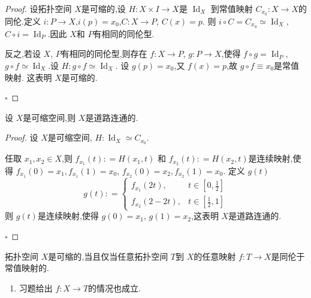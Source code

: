 \documentclass[../../几何与拓扑.tex]{subfiles}
\begin{document}
\begin{proof}

    设拓扑空间 \(  X  \)是可缩的,设 \(  H:X \times I\to X\)是 \(  \operatorname{Id}_{X}  \)   到常值映射 \(  C_{x_0}:X \to X  \)的同伦.定义 \(  i: P \to X  \),\(  i\left( p \right)= x_0   \),\(  C:X \to P  \), \(  C\left( x \right)= p   \).
    则 \(  i\circ C =  C_{x_0} \simeq  \operatorname{Id}_{X}  \), \(  C\circ i  = \operatorname{Id}_{P}  \).因此 \(  X  \)和 \(  P  \)有相同的同伦型.
    
    反之,若设 \(  X  \), \(  P  \)有相同的同伦型,则存在 \(  f:X \to P  \), \(  g:P\to X  \),使得 \(  f\circ g = \operatorname{Id}_{P}  \), \(  g\circ f \simeq \operatorname{Id}_{X}  \).设 \(  H: g \circ f \simeq  \operatorname{Id}_{X}  \). 设 \(  g\left( p \right)= x_0   \),又 \(  f\left( x \right)= p   \),故 \(  g\circ f \equiv x_0  \)是常值映射.  这表明 \(  X  \)是可缩的.        

    \hfill $\square$
\end{proof}

\begin{proposition}
    设 \(  X  \)是可缩空间,则 \(  X  \)是道路连通的.  
\end{proposition}

\begin{proof}

    设 \(  X  \)是可缩空间, \(  H: \operatorname{Id}_{X}\simeq  C_{x_0}  \).   
    
    任取 \(  x_1,x_2 \in X  \),则 \( f_{x_1}\left( t \right): =    H\left( x_1,t \right)   \) 和 \(  f_{x_2}\left( t \right): =  H\left( x_2,t \right)    \)是连续映射,使得 \(  f_{x_1}\left( 0 \right)= x_1,f_{x_1}\left( 1 \right)= x_0    \), \(  f_{x_2}\left( 0 \right)= x_2,f_{x_2}\left( 1 \right)= x_0    \).
    定义 \(  g\left( t \right)   \)  \[
    g\left( t \right): =  \begin{cases}  f_{x_1}\left( 2t \right),& t \in [0, \frac{1}{2}]\\ 
     f_{x_2}\left( 2-2t \right),& t \in [\frac{1}{2},1]   \end{cases}  
    \]则 \(  g\left( t \right)   \)是连续映射,使得 \(  g\left( 0 \right)=  x_1   \), \(  g\left( 1 \right)= x_2   \),这表明 \(  X  \)是道路连通的.    

    \hfill $\square$
\end{proof}



\begin{proposition}
    拓扑空间 \(  X  \)是可缩的,当且仅当任意拓扑空间 \(  T  \)到 \(  X  \)的任意映射 \(  f:T \to X  \)是同伦于常值映射的.    
\end{proposition}
\begin{remark}
    \begin{enumerate}
        \item 习题给出 \(  f: X\to T  \)的情况也成立. 
    \end{enumerate}
    
\end{remark}
\end{document}
